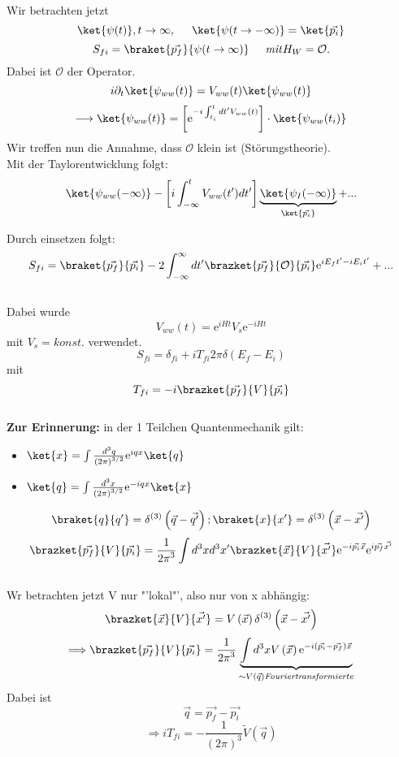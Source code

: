 Wir betrachten jetzt \[ \ket{\psi(t)}, t \to \infty, \hspace{0,5cm} \ket{\psi 
(t\to - \infty)} = \ket{\vec{p_i}} \]
\[ S_{fi} = \braket{\vec{p_f}}{\psi (t \to \infty)} \hspace{0,5cm} \mathit{mit} 
H_W = \mathcal{O}.\] Dabei ist $\mathcal{O}$ der Operator. \\
\[ i \partial_t\ket{\psi_{ww}(t)} = V_{ww} (t) \ket{\psi_{ww}(t)} \]
\[ \longrightarrow \ket{\psi_{ww}(t)} =\left[ \mathrm{e}^{-i \int_{t_i}^{t} dt' 
V_{ww}(t)} \right] \cdot \ket{\psi_{ww}(t_i)} \]
Wir treffen nun die Annahme, dass $\mathcal{O}$ klein ist (Störungstheorie).\\
Mit der Taylorentwicklung folgt: 
\[ \ket{\psi_{ww}(-\infty)} - \left[ i \int_{-\infty}^{t} V_{ww}(t') dt' 
\right] \underbrace{\ket{\psi_{I}(-\infty)}}_{\ket{\vec{p_i}}} + ...\]

Durch einsetzen folgt: \[ S_{fi} = \braket{\vec{p_f}}{\vec{p_i}} - 2 
\int_{-\infty}^{\infty} dt' \brazket{\vec{p_f}}{\mathcal{O}}{\vec{p_i}} 
\mathrm{e}^{iE_ft' - iE_it'} + ...\] \\
Dabei wurde \[ V_{ww}(t) = \mathrm{e}^{iHt} V_s \mathrm{e}^{-iHt} \] mit $ V_s 
= \mathit{konst.} $ verwendet. \\
\[ S_{fi} = \delta_{fi} + i T_{fi} 2 \pi \delta \left( E_f - E_i \right) \] mit 
\[ T_{fi} = -i \brazket{\vec{p_f}}{V}{\vec{p_i}} \]
\\
\textbf{Zur Erinnerung:} in der 1 Teilchen Quantenmechanik gilt: 
\begin{itemize}
	\item[] $\ket{x} = \int \frac{d^3q}{{(2\pi)}^{3/2}} \mathrm{e}^{iqx} 
	\ket{q} $
	\item[] $\ket{q} = \int \frac{d^3x}{{(2\pi)}^{3/2}} \mathrm{e}^{-iqx} 
	\ket{x} $
\end{itemize}
\[ \braket{q}{q'} = \delta^{(3)} \left( \vec{q} - \vec{q'} \right) ; 
\braket{x}{x'} = \delta^{(3)} \left( \vec{x} - \vec{x'} \right) \]
\[ \brazket{\vec{p_f}}{V}{\vec{p_i}} = \frac{1}{{2\pi}^3} \int d^3x d^3x' 
\brazket{\vec{x}}{V}{\vec{x'}} \mathrm{e}^{-i\vec{p_i}\vec{x}} 
\mathrm{e}^{i\vec{p_f}\vec{x'}} \] \\
Wr betrachten jetzt V nur "'lokal"', also nur von x abhängig: \[ 
\brazket{\vec{x}}{V}{\vec{x'}} = V \left( \vec{x} \right) \delta^{(3)} \left( 
\vec{x} - \vec{x'} \right) \]
\[ \Longrightarrow \brazket{\vec{p_f}}{V}{\vec{p_i}} = \frac{1}{{2\pi}^3} 
\underbrace{\int d^3x  V \left( \vec{x} \right) \mathrm{e}^{-i \left( \vec{p_i} 
- \vec{p_f} \right) \vec{x}} }_{\sim V\left( \vec{q} \right) 
\mathit{Fouriertransformierte}} \]
Dabei ist \[ \vec{q} = \vec{p_f} - \vec{p_i} \]
\[ \Longrightarrow i T_{fi} = - \frac{1}{({2\pi})^3} \tilde{V}\left( \vec{q} 
\right) \]

